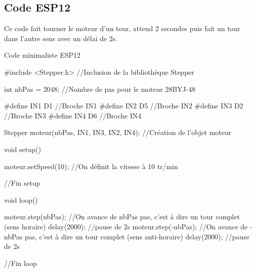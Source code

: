 \subsection{Code ESP12}

Ce code fait tourner le moteur d'un tour, attend 2 secondes puis fait un tour dans l'autre sens avec un délai de 2s.

\begin{Cpp}{Code minimaliste ESP12}

  #include <Stepper.h> //Inclusion de la bibliothèque Stepper
  
  int nbPas = 2048; //Nombre de pas pour le moteur 28BYJ-48
  
  #define IN1 D1  //Broche IN1
  #define IN2 D5  //Broche IN2
  #define IN3 D2  //Broche IN3
  #define IN4 D6  //Broche IN4
  
  Stepper moteur(nbPas, IN1, IN3, IN2, IN4); //Création de l'objet moteur
     
    void setup() {
  
      moteur.setSpeed(10); //On définit la vitesse à 10 tr/min
  
    }//Fin setup
     
    void loop() {
  
      moteur.step(nbPas);   //On avance de nbPas pas, c'est à dire un tour complet (sens horaire)
      delay(2000);          //pause de 2s
      moteur.step(-nbPas);  //On avance de -nbPas pas, c'est à dire un tour complet (sens anti-horaire)
      delay(2000);          //pause de 2s
  
    }//Fin loop
  \end{Cpp}
  

